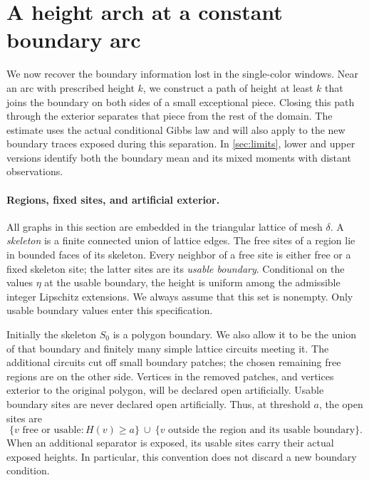 \section{A height arch at a constant boundary arc}\label{sec:boundary}

We now recover the boundary information lost in the single-color windows.
Near an arc with prescribed height $k$, we construct a path of height at
least $k$ that joins the boundary on both sides of a small exceptional
piece.  Closing this path through the exterior separates that piece from
the rest of the domain.  The estimate uses the actual conditional Gibbs
law and will also apply to the new boundary traces exposed during this
separation.  In \cref{sec:limits}, lower and upper versions identify both
the boundary mean and its mixed moments with distant observations.

\paragraph{Regions, fixed sites, and artificial exterior.}
All graphs in this section are embedded in the triangular lattice of mesh
$\delta$.  A \emph{skeleton} is a finite connected union of lattice edges.
The free sites of a region lie in bounded faces of its skeleton.  Every
neighbor of a free site is either free or a fixed skeleton site; the latter
sites are its \emph{usable boundary}.  Conditional on the values $\eta$ at
the usable boundary, the height is uniform among the admissible integer
Lipschitz extensions.  We always assume that this set is nonempty.
Only usable boundary values enter this specification.

Initially the skeleton $S_0$ is a polygon boundary.  We also allow it to be
the union of that boundary and finitely many simple lattice circuits meeting
it.  The additional circuits cut off small boundary patches; the chosen
remaining free regions are on the other side.  Vertices in the removed
patches, and vertices exterior to the original polygon, will be declared
open artificially.  Usable boundary sites are never declared open
artificially.  Thus, at threshold $a$, the open sites are
\begin{equation}\label{eq:boundary-open-sites}
 \{v\text{ free or usable}:H(v)\ge a\}
 \ \cup\ \{v\text{ outside the region and its usable boundary}\}.
\end{equation}
When an additional separator is exposed, its usable sites carry their
actual exposed heights.  In particular, this convention does not discard a
new boundary condition.

